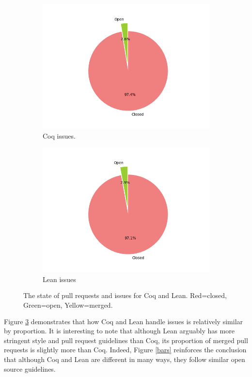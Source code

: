 \documentclass[sigconf,nonacm]{acmart}
\begin{document}
\begin{figure}[H]
\begin{subfigure}[b]{0.45\columnwidth}
    \includegraphics[width=\linewidth]{coq_isuses_state.png}
    \caption{Coq issues.}
    \label{coq issues}
  \end{subfigure}
  \hfill %
  \begin{subfigure}[b]{0.45\columnwidth}
    \includegraphics[width=\linewidth]{lean_isuses_state.png}
    \caption{Lean issues}
    \label{lean prs}
  \end{subfigure}
  \caption{The state of pull requests and issues for Coq and Lean. Red=closed, Green=open, Yellow=merged.}
  \label{circles}
\end{figure}

Figure \ref{circles} demonstrates that how Coq and Lean handle issues is relatively similar by proportion. It is interesting to note that although Lean arguably has more stringent style and pull request guidelines than Coq, its proportion of merged pull requests is slightly more than Coq. Indeed, Figure \ref{bars} reinforces the conclusion that although Coq and Lean are different in many ways, they follow similar open source guidelines.
\end{document}
